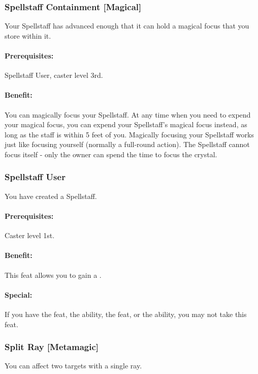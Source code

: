 \subsubsection[Spellstaff Containment]{Spellstaff Containment [Magical]}
\label{Feat:SpellstaffContainment}
Your Spellstaff has advanced enough that it can hold a magical focus that you store within it.

\paragraph{Prerequisites:} Spellstaff User, caster level 3rd.

\paragraph{Benefit:} You can magically focus your Spellstaff. 
At any time when you need to expend your magical focus, you can expend your Spellstaff's magical focus instead, as long as the staff is within 5 feet of you. 
Magically focusing your Spellstaff works just like focusing yourself (normally a full-round action).
The Spellstaff cannot focus itself - only the owner can spend the time to focus the crystal.

\subsubsection{Spellstaff User}
\label{Feat:SpellstaffUser}
You have created a Spellstaff.

\paragraph{Prerequisites:} Caster level 1st.
 
\paragraph{Benefit:} This feat allows you to gain a . 

\paragraph{Special:} If you have the  feat, the  ability, the  feat, or the  ability, you may not take this feat.
\subsubsection[Split Ray]{Split Ray [Metamagic]}
\label{Feat:SplitRay}
You can affect two targets with a single ray.

